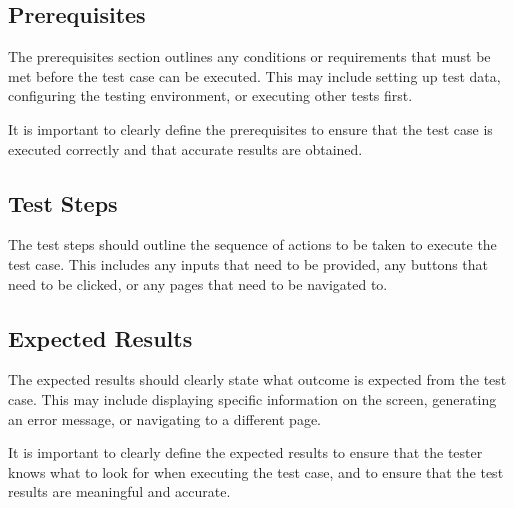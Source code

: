 \documentclass[title page]{article}
\begin{document}
\subsection{Prerequisites}
The prerequisites section outlines any conditions or requirements that must be met before the test case can be executed. This may include setting up test data, configuring the testing environment, or executing other tests first.

It is important to clearly define the prerequisites to ensure that the test case is executed correctly and that accurate results are obtained.

\subsection{Test Steps}
The test steps should outline the sequence of actions to be taken to execute the test case. This includes any inputs that need to be provided, any buttons that need to be clicked, or any pages that need to be navigated to.

\subsection{Expected Results}
The expected results should clearly state what outcome is expected from the test case. This may include displaying specific information on the screen, generating an error message, or navigating to a different page.

It is important to clearly define the expected results to ensure that the tester knows what to look for when executing the test case, and to ensure that the test results are meaningful and accurate.
\end{document}
